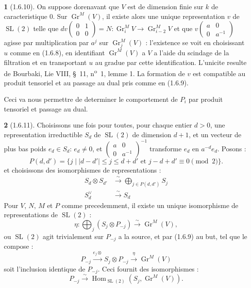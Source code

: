\documentclass[12pt,a4paper]{article}
\theoremstyle{plain}
\theoremstyle{definition}
\theoremstyle{definition}
\newtheorem{para}{}[section]
\theoremstyle{remark}
\DeclareMathOperator{\Gr}{Gr}
\DeclareMathOperator{\Hom}{Hom}
\DeclareMathOperator{\SL}{SL}
\begin{document}
\begin{para}[1.6.10]
On suppose dorenavant que $V$ est de dimension finie sur $k$ de caracteristique $0$. Sur $\Gr^M(V)$, il existe alors une unique representation $v$ de $\SL(2)$ telle que $dv(\begin{smallmatrix} 0&1\\0&0 \end{smallmatrix}) = N: \Gr_i^M V \to \Gr_{i-2}^M V$ et que $v(\begin{smallmatrix} a&0\\0&a^{-1} \end{smallmatrix})$ agisse par multiplication par $a^j$ sur $\Gr_j^M(V)$ : l'existence se voit en choisissant $u$ comme en (1.6.8), en identifiant $\Gr^M(V)$ a $V$ a l'aide du scindage de la filtration et en transportant $u$ au gradue par cette identification. L'unicite resulte de Bourbaki, Lie VIII, \S~11, n\textsuperscript{o}~1, lemme 1. La formation de $v$ est compatible au produit tensoriel et au passage au dual pris comme en (1.6.9).

Ceci va nous permettre de determiner le comportement de $P_i$ par produit tensoriel et passage au dual.
\end{para}

\begin{para}[1.6.11]
Choisissons une fois pour toutes, pour chaque entier $d > 0$, une representation irreductible $S_d$ de $\SL(2)$ de dimension $d+1$, et un vecteur de plus bas poids $e_d \in S_d$: $e_d \neq 0$, et $(\begin{smallmatrix} a&0\\0&a^{-1} \end{smallmatrix})^{-1}$ transforme $e_d$ en $a^{-d} e_d$. Posons :
\[P(d, d') = \{j \mid |d-d'| \leq j \leq d+d' \text{ et } j - d + d' \equiv 0 \pmod{2}\}.\]
et choisissons des isomorphismes de representations :
\begin{align}
S_d \otimes S_{d'} &\xrightarrow{\sim} \bigoplus_{j \in P(d,d')} S_j \tag{1.6.11.2}\\
S_d^\vee &\xrightarrow{\sim} S_d \tag{1.6.11.3}
\end{align}
Pour $V$, $N$, $M$ et $P$ comme precedemment, il existe un unique isomorphisme de representations de $\SL(2)$ :
\begin{equation}\tag{1.6.11.4}
\eta: \bigoplus_j (S_j \otimes P_{-j}) \xrightarrow{\sim} \Gr^M(V),
\end{equation}
ou $\SL(2)$ agit trivialement sur $P_{-j}$ a la source, et par (1.6.9) au but, tel que le compose :
\[P_{-j} \xrightarrow{e_j \otimes} S_j \otimes P_{-j} \xrightarrow{\eta} \Gr^M(V)\]
soit l'inclusion identique de $P_{-j}$. Ceci fournit des isomorphismes :
\begin{equation}\tag{1.6.11.5}
P_{-j} \xrightarrow{\sim} \Hom_{\SL(2)}(S_j, \Gr^M(V)).
\end{equation}
\end{para}
\end{document}
